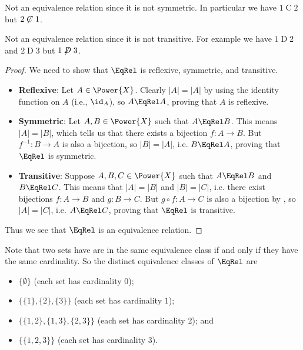 \begin{questions}
\begin{partquestions}{\alph*}
        \item Not an equivalence relation since it is not symmetric. In particular we have $1 \mathrel{C} 2$ but $2 \not\mathrel{C} 1$.
        
        \item Not an equivalence relation since it is not transitive. For example we have $1 \mathrel{D} 2$ and $2 \mathrel{D} 3$ but $1 \not\mathrel{D} 3$.
    \end{partquestions}

    \item \begin{partquestions}{\alph*}
        \item \begin{proof}
            We need to show that $\EqRel$ is reflexive, symmetric, and transitive.
            \begin{itemize}
                \item \textbf{Reflexive}: Let $A \in \Power{X}$. Clearly $|A| = |A|$ by using the identity function on $A$ (i.e., $\id_A$), so $A \EqRel A$, proving that $A$ is reflexive.
                
                \item \textbf{Symmetric}: Let $A, B \in \Power{X}$ such that $A \EqRel B$. This means $|A| = |B|$, which tells us that there exists a bijection $f: A \to B$. But $f^{-1}: B \to A$ is also a bijection, so $|B| = |A|$, i.e. $B \EqRel A$, proving that $\EqRel$ is symmetric.
                
                \item \textbf{Transitive}: Suppose $A, B, C \in \Power{X}$ such that $A \EqRel B$ and $B \EqRel C$. This means that $|A| = |B|$ and $|B| = |C|$, i.e. there exist bijections $f: A \to B$ and $g: B \to C$. But $g \circ f: A \to C$ is also a bijection by , so $|A| = |C|$, i.e. $A \EqRel C$, proving that $\EqRel$ is transitive.
            \end{itemize}
            Thus we see that $\EqRel$ is an equivalence relation.
        \end{proof}

        \item Note that two sets have are in the same equivalence class if and only if they have the same cardinality. So the distinct equivalence classes of $\EqRel$ are
        \begin{itemize}
            \item $\{\emptyset\}$ (each set has cardinality 0);
            \item $\{\{1\}, \{2\}, \{3\}\}$ (each set has cardinality 1);
            \item $\{\{1, 2\}, \{1, 3\}, \{2, 3\}\}$ (each set has cardinality 2); and
            \item $\{\{1, 2, 3\}\}$ (each set has cardinality 3).
        \end{itemize}
    \end{partquestions}


\end{questions}
